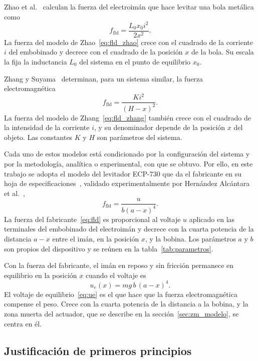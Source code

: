 Zhao et al.~\cite{zhao} calculan la fuerza del electroimán que hace levitar una bola metálica como
\begin{equation}
f_{\text{fld}} = \frac{L_0 x_0 i^2}{2x^2} .
\label{eq:fld_zhao}
\end{equation}
La fuerza del modelo de Zhao~\eqref{eq:fld_zhao} crece con el cuadrado de la corriente $i$ del embobinado y decrece con el cuadrado de la posición $x$ de la bola. Su escala la fija la inductancia $L_0$ del sistema en el punto de equilibrio $x_0$.

Zhang y Suyama~\cite{feifei} determinan, para un sistema similar, la fuerza electromagnética
\begin{equation}
f_{\text{fld}} = \frac{K i^2}{(H - x)^2} .
\label{eq:fld_zhang}
\end{equation}
La fuerza del modelo de Zhang~\eqref{eq:fld_zhang} también crece con el cuadrado de la intensidad de la corriente $i$, y su denominador depende de la posición $x$ del objeto. Las constantes $K$ y $H$ son parámetros del sistema.

Cada uno de estos modelos está condicionado por la configuración del sistema y por la metodología, analítica o experimental, con que se obtuvo. Por ello, en este trabajo se adopta el modelo del levitador ECP-730 que da el fabricante en su hoja de especificaciones~\cite{parks}, validado experimentalmente por Hernández Alcántara et al.~\cite{alcantara},
\begin{equation}
f_{\text{fld}} = \frac{u}{b(a-x)^4} .
\label{eq:fld}
\end{equation}
La fuerza del fabricante~\eqref{eq:fld} es proporcional al voltaje $u$ aplicado en las terminales del embobinado del electroimán y decrece con la cuarta potencia de la distancia $a-x$ entre el imán, en la posición $x$, y la bobina. Los parámetros $a$ y $b$ son propios del dispositivo y se reúnen en la tabla~\ref{tab:parametros}.

Con la fuerza del fabricante, el imán en reposo y sin fricción permanece en equilibrio en la posición $x$ cuando el voltaje es
\begin{equation}
u_e(x) = mg\,b\,(a-x)^4 .
\label{eq:ue}
\end{equation}
El voltaje de equilibrio~\eqref{eq:ue} es el que hace que la fuerza electromagnética compense el peso. Crece con la cuarta potencia de la distancia a la bobina, y la zona muerta del actuador, que se describe en la sección~\ref{sec:zm_modelo}, se centra en él.

\subsection{Justificación de primeros principios}\label{sec:fuerza_primeros_principios}

